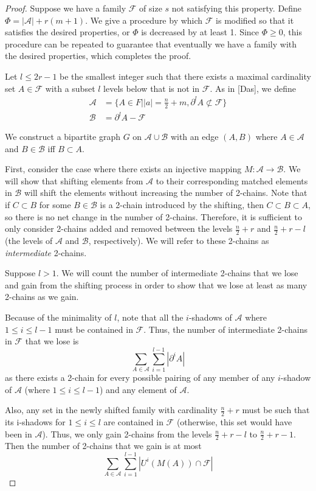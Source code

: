 \documentclass[12pt]{article}
\theoremstyle{plain}
\theoremstyle{definition}
\theoremstyle{remark}
\newcommand{\F}{\mathcal{F}}
\newcommand{\A}{\mathcal{A}}
\newcommand{\B}{\mathcal{B}}
\begin{document}
\begin{proof} 
Suppose we have a family $\F$ of size $s$ not satisfying this property. Define $\Phi = |\A| + r(m+1)$. We give a procedure by which $\F$ is modified so that it satisfies the desired properties, or $\Phi$ is decreased by at least 1. Since $\Phi \geq 0$, this procedure can be repeated to guarantee that eventually we have a family with the desired properties, which completes the proof.

Let $l \leq 2r-1$ be the smallest integer such that there exists a maximal cardinality set $A \in \F$ with a subset $l$ levels below that is not in $\F$. As in [Das], we define
\begin{align*}
\A &= \{A \in F| \lvert a \rvert = \frac{n}{2}+m, \partial^l A \not\subset \F \}\\
\B &= \partial^l A - \F
\end{align*}

We construct a bipartite graph $G$ on $\A \cup \B$ with an edge $(A,B)$ where $A \in \A$ and $B \in \B$ iff $B \subset A$.

First, consider the case where there exists an injective mapping $M: \A \to \B$. We will show that shifting elements from $\A$ to their corresponding matched elements in $\B$ will shift the elements without increasing the number of 2-chains. Note that if $C \subset B$ for some $B \in \B$ is a 2-chain introduced by the shifting, then $C \subset B \subset A$, so there is no net change in the number of 2-chains. Therefore, it is sufficient to only consider 2-chains added and removed between the levels $\frac{n}{2} + r$ and $\frac{n}{2} + r - l$ (the levels of $\A$ and $\B$, respectively). We will refer to these 2-chains as \emph{intermediate} 2-chains.

Suppose $l > 1$. We will count the number of intermediate 2-chains that we lose and gain from the shifting process in order to show that we lose at least as many 2-chains as we gain.

Because of the minimality of $l$, note that all the $i$-shadows of $\A$ where $1 \leq i \leq l - 1$ must be contained in $\F$. Thus, the number of intermediate 2-chains in $\F$ that we lose is
\[ \sum_{A \in \A}\sum_{i = 1}^{l-1} |\partial^i A | \]
as there exists a 2-chain for every possible pairing of any member of any $i$-shadow of $\A$ (where $1 \leq i \leq l-1$) and any element of $\A$. 

Also, any set in the newly shifted family with cardinality $\frac{n}{2} + r$ must be such that its i-shadows for $1 \leq i \leq l$ are contained in $\F$ (otherwise, this set would have been in $\A$). Thus, we only gain 2-chains from the levels $\frac{n}{2} + r - l$ to $\frac{n}{2} + r - 1$. Then the number of 2-chains that we gain is at most
\[\sum_{A\in \A}\sum_{i = 1}^{l-1} |U^i(M(A)) \cap \F| \]


\end{proof}
\end{document}
